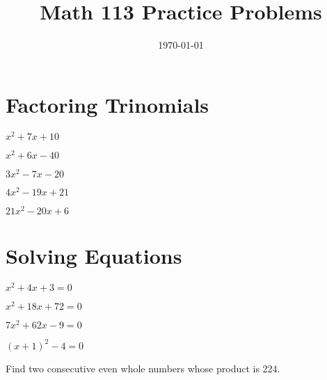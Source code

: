 \documentclass[fleqn,addpoints]{exam}
\title{Math 113 Practice Problems}
\author{}
\date{\today}
\begin{document}
\maketitle

\section{Factoring Trinomials}

\begin{questions}

\question \( x^2 + 7x + 10 \)
\vspace{1 in}

\question \( x^2 + 6x - 40 \)
\vspace{1 in}

\question \( 3x^2 - 7x - 20 \)
\vspace{1 in}

\question \( 4x^2 - 19x + 21 \)
\vspace{1 in}

\question \( 21x^2 - 20x + 6 \)
\vspace{1 in}

\section{Solving Equations}

\question \( x^2 + 4x + 3 = 0 \)
\vspace{1 in}

\question \( x^2 + 18x + 72 = 0 \)
\vspace{1 in}

\question \( 7x^2 + 62x - 9 = 0 \)
\vspace{1 in}

\question \( (x + 1)^2 - 4 = 0 \)
\vspace{1 in}

\question 
Find two consecutive even whole numbers whose product is 224.
\vspace{1 in}

\end{questions}
\end{document}

